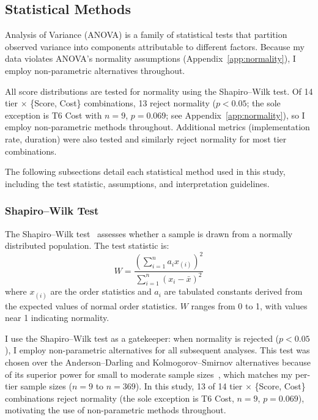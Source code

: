 \documentclass[11pt]{article}
\begin{document}
\subsection{Statistical Methods}
\label{sec:statistical_methods}

Analysis of Variance (ANOVA) is a family of statistical tests that partition
observed variance into components attributable to different factors. Because my
data violates ANOVA's normality assumptions (Appendix~\ref{app:normality}), I
employ non-parametric alternatives throughout.

All score distributions are tested for normality using the Shapiro--Wilk test.
Of 14 tier $\times$ \{Score, Cost\} combinations, 13 reject normality
($p < 0.05$; the sole exception is T6 Cost with $n=9$, $p=0.069$; see
Appendix~\ref{app:normality}), so I employ non-parametric methods
throughout. Additional metrics (implementation rate, duration) were also
tested and similarly reject normality for most tier combinations.

The following subsections detail each statistical method used in this study,
including the test statistic, assumptions, and interpretation guidelines.

\subsubsection{Shapiro--Wilk Test}
\label{sec:shapiro_wilk}

The Shapiro--Wilk test~\cite{shapiro1965analysis} assesses whether a sample is
drawn from a normally distributed population. The test statistic is:
\begin{equation}
  W = \frac{\left(\sum_{i=1}^{n} a_i x_{(i)}\right)^2}{\sum_{i=1}^{n}(x_i - \bar{x})^2}
\end{equation}
where $x_{(i)}$ are the order statistics and $a_i$ are tabulated constants
derived from the expected values of normal order statistics. $W$ ranges from
0 to 1, with values near 1 indicating normality.

I use the Shapiro--Wilk test as a gatekeeper: when normality is rejected
($p < 0.05$), I employ non-parametric alternatives for all subsequent
analyses. This test was chosen over the Anderson--Darling and
Kolmogorov--Smirnov alternatives because of its superior power for small to
moderate sample sizes~\cite{razali2011power}, which matches my per-tier
sample sizes ($n = 9$ to $n = 369$). In this study, 13 of 14 tier $\times$
\{Score, Cost\} combinations reject normality (the sole exception is T6 Cost,
$n=9$, $p=0.069$), motivating the use of non-parametric methods throughout.
\end{document}
